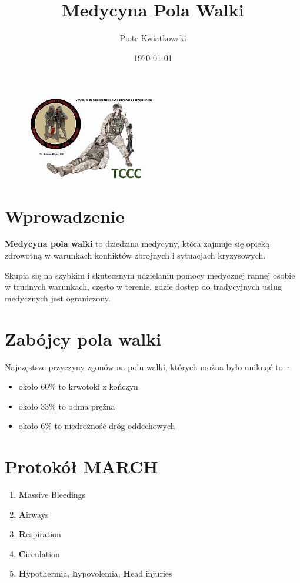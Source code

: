 \documentclass{article}
\begin{document}
\title{Medycyna Pola Walki}
\author{Piotr Kwiatkowski}
\date{\today}
\maketitle
\begin{figure}[h]
\centering
    \includegraphics[width=0.5\textwidth]{pictures/zdjecia_Piotr/tccc.jpg}

\end{figure}
\section{Wprowadzenie}
\textbf{Medycyna pola walki} to dziedzina medycyny, która zajmuje się opieką zdrowotną w warunkach konfliktów zbrojnych i sytuacjach kryzysowych.\par Skupia się na szybkim i skutecznym udzielaniu pomocy medycznej rannej osobie w trudnych warunkach, często w terenie, gdzie dostęp do tradycyjnych usług medycznych jest ograniczony.

\section{Zabójcy pola walki}
Najczęstsze przyczyny zgonów na polu walki, których można było uniknąć to:·
\begin{itemize}
    \item około 60\% to krwotoki z kończyn
    \item około 33\% to odma prężna
    \item około 6\% to niedrożność dróg oddechowych
\end{itemize}
\newpage
\section{Protokół MARCH}
\begin{enumerate}
    \item \textbf{M}assive Bleedings
    \item \textbf{A}irways
    \item \textbf{R}espiration
    \item \textbf{C}irculation
    \item \textbf{H}ypothermia, \textbf{h}ypovolemia, \textbf{H}ead injuries
\end{enumerate}
\end{document}
